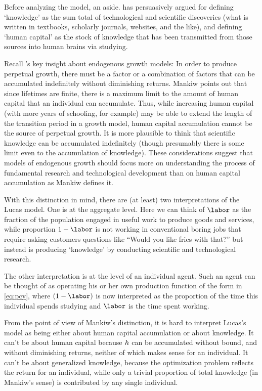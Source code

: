 \documentclass{handout}
\begin{document}
Before analyzing the model, an aside.  \cite{mankiw:growth} has persuasively 
argued for defining `knowledge' as the sum
total of technological and scientific discoveries (what is
written in textbooks, scholarly journals, websites, and the like),
and defining `human capital' as the stock of knowledge
that has been transmitted from those sources into human brains via
studying.

Recall \cite{rebelo:long}'s key insight about endogenous growth models: In order
to produce perpetual growth, there must be a factor or a combination
of factors that can be accumulated indefinitely without diminishing
returns.  Mankiw points out that since lifetimes are finite, there is a
maximum limit to the amount of human capital that an individual can accumulate.
Thus, while increasing human capital (with more years of schooling,
for example) may be able to extend the length of the transition period
in a growth model, human capital accumulation cannot be the source of
perpetual growth.  It is more plausible to think that scientific knowledge can be
accumulated indefinitely (though presumably there is some limit even
to the accumulation of knowledge).  These considerations
suggest that models of endogenous growth should focus more on
understanding the process of fundamental research and technological
development than on human capital accumulation as Mankiw defines it.

With this distinction in mind, there are (at least) two
interpretations of the Lucas model.  One is at the aggregate level.
Here we can think of $\labor$ as the fraction of the population
engaged in useful work to produce goods and services, while proportion
$1-\labor$ is not working in conventional boring jobs that require 
asking customers questions like ``Would you like
fries with that?'' but instead is producing `knowledge' by
conducting scientific and technological research.

The other interpretation is at the level of an individual agent.  Such
an agent can be thought of as operating his or her own production
function of the form in \eqref{eq:pcy}, where $(1-\labor)$ is now
interpreted as the proportion of the time this individual spends
studying and $\labor$ is the time spent working.  

From the point of view of
Mankiw's distinction, it is hard to interpret Lucas's model as being
either about human capital accumulation or about knowledge.  It can't
be about human capital because $h$ can be accumulated without bound,
and without diminishing returns, neither of which makes sense for an
individual.  It can't be about generalized knowledge, because the
optimization problem reflects the return for an individual, while only
a trivial proportion of total knowledge (in Mankiw's sense) is
contributed by any single individual.
\end{document}

